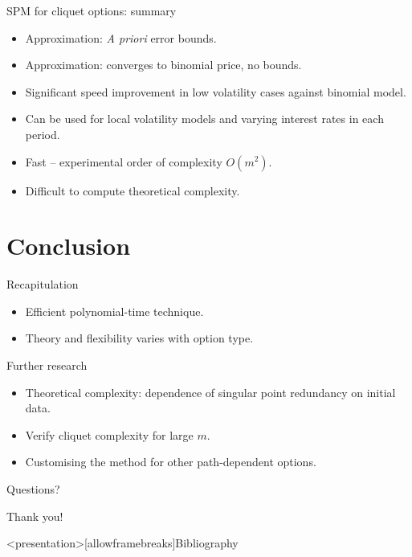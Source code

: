 \documentclass[utf8,t,compress,xcolor=svgnames,handout]{beamer}
\newcommand\pro{\item[\textbf{\CheckedBox}]}
\newcommand\con{\item[\textbf{\XBox}]}
\begin{document}
	
	\begin{frame}{SPM for cliquet options: summary}
		\begin{itemize}
			\pro Approximation: \emph{A priori} error bounds.
			\con<alert@1-> Approximation: converges to binomial price, no bounds.
			\pro Significant speed improvement in low volatility cases against binomial model.
			\pro<alert@1-> Can be used for local volatility models and varying interest rates in each period.
			\pro<alert@1-> Fast -- experimental order of complexity $ O(m^2) $.
			\con Difficult to compute theoretical complexity.
		\end{itemize}
	\end{frame}
	
	
	\section{Conclusion}
	
	\begin{frame}{Recapitulation}
		\begin{itemize}
			\item Efficient polynomial-time technique.
			\item Theory and flexibility varies with option type.
		\end{itemize}
		
		Further research
		\begin{itemize}
			\item Theoretical complexity: dependence of singular point redundancy on initial data.
			\item Verify cliquet complexity for large $ m $.
			\item Customising the method for other path-dependent options.
		\end{itemize}
	\end{frame}
	
	
	\begin{frame}[plain,c]
		
		\begin{center}
			{\Huge Questions?}
		\end{center}
		
		\vfill
		
		\begin{center}
			{\Huge Thank you!}
		\end{center}
		
	\end{frame}
	
	
	
	\appendix
	
	\begin{frame}<presentation>[allowframebreaks]{Bibliography}
		\printbibliography
	\end{frame}
	
	
\end{document}
